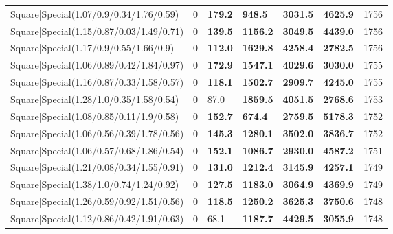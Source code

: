 \begin{tabular}{lrllllr}
 Square|Special(1.07/0.9/0.34/1.76/0.59)                       &             0   & \textbf{179.2} & \textbf{948.5}  & \textbf{3031.5} & \textbf{4625.9} &         1756 \\
 Square|Special(1.15/0.87/0.03/1.49/0.71)                      &             0   & \textbf{139.5} & \textbf{1156.2} & \textbf{3049.5} & \textbf{4439.0} &         1756 \\
 Square|Special(1.17/0.9/0.55/1.66/0.9)                        &             0   & \textbf{112.0} & \textbf{1629.8} & \textbf{4258.4} & \textbf{2782.5} &         1756 \\
 Square|Special(1.06/0.89/0.42/1.84/0.97)                      &             0   & \textbf{172.9} & \textbf{1547.1} & \textbf{4029.6} & \textbf{3030.0} &         1755 \\
 Square|Special(1.16/0.87/0.33/1.58/0.57)                      &             0   & \textbf{118.1} & \textbf{1502.7} & \textbf{2909.7} & \textbf{4245.0} &         1755 \\
 Square|Special(1.28/1.0/0.35/1.58/0.54)                       &             0   & 87.0           & \textbf{1859.5} & \textbf{4051.5} & \textbf{2768.6} &         1753 \\
 Square|Special(1.08/0.85/0.11/1.9/0.58)                       &             0   & \textbf{152.7} & \textbf{674.4}  & \textbf{2759.5} & \textbf{5178.3} &         1752 \\
 Square|Special(1.06/0.56/0.39/1.78/0.56)                      &             0   & \textbf{145.3} & \textbf{1280.1} & \textbf{3502.0} & \textbf{3836.7} &         1752 \\
 Square|Special(1.06/0.57/0.68/1.86/0.54)                      &             0   & \textbf{152.1} & \textbf{1086.7} & \textbf{2930.0} & \textbf{4587.2} &         1751 \\
 Square|Special(1.21/0.08/0.34/1.55/0.91)                      &             0   & \textbf{131.0} & \textbf{1212.4} & \textbf{3145.9} & \textbf{4257.1} &         1749 \\
 Square|Special(1.38/1.0/0.74/1.24/0.92)                       &             0   & \textbf{127.5} & \textbf{1183.0} & \textbf{3064.9} & \textbf{4369.9} &         1749 \\
 Square|Special(1.26/0.59/0.92/1.51/0.56)                      &             0   & \textbf{118.5} & \textbf{1250.2} & \textbf{3625.3} & \textbf{3750.6} &         1748 \\
 Square|Special(1.12/0.86/0.42/1.91/0.63)                      &             0   & 68.1           & \textbf{1187.7} & \textbf{4429.5} & \textbf{3055.9} &         1748 \\

\end{tabular}
